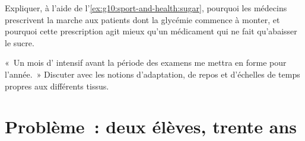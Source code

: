 \begin{exercise}[$\star\star\star$]\label{exo:g10:sport-and-health:14}
Expliquer, à l'aide de l'\cref{ex:g10:sport-and-health:sugar}, pourquoi
les médecins prescrivent la marche aux patients dont la glycémie
commence à monter, et pourquoi cette prescription agit mieux qu'un
médicament qui ne fait qu'abaisser le sucre.
\end{exercise}

\begin{exercise}[$\star\star\star$]\label{exo:g10:sport-and-health:15}
«~Un mois d' intensif avant la période des examens me
mettra en forme pour l'année.~» Discuter avec les notions d'adaptation,
de repos et d'échelles de temps propres aux différents tissus.
\end{exercise}

\section{Problème~: deux élèves, trente ans}


